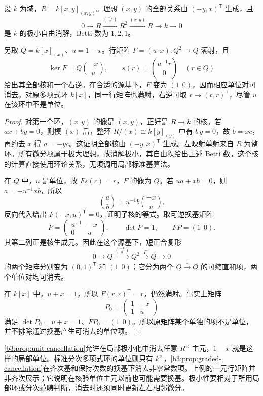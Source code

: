 \begin{example}\label{b3:exm:F-local-resolution}\label{b3:exm:F-module-unit}
	设 \(k\) 为域，\(R=k[x,y]_{(x,y)}\)。理想 \((x,y)\) 的全部关系由 \((-y,x)^{\mathsf T}\) 生成，且
	\[
		0\longrightarrow R \xrightarrow{\binom{-y}{x}}R^2 \xrightarrow{(x\ \ y)}R \longrightarrow k\longrightarrow0
	\]
	是 \(k\) 的极小自由消解，Betti 数为 \(1,2,1\)。

	另取 \(Q=k[x]_{(x)}\)、\(u=1-x\)。行矩阵 \(F=(u\ \ x):Q^2\rightarrow Q\) 满射，且
	\[
		\ker F=Q\binom{-x}{u}, \qquad s(r)=\binom{u^{-1}r}{0}\quad(r\in Q)
	\]
	给出其全部核和一个右逆。在合适的源基下，\(F\) 变为 \((1\ \ 0)\)，因而相应单位对可消去。对原多项式环 \(k[x]\)，同一行矩阵也满射，右逆可取 \(r\mapsto(r,r)^{\mathsf T}\)，尽管 \(u\) 在该环中不是单位。
\end{example}
\begin{proof}
	对第一个环，\((x\ \ y)\) 的像是 \((x,y)\)，正好是 \(R\rightarrow k\) 的核。若 \(ax+by=0\)，则模 \((x)\) 后，整环 \(R/(x)\cong k[y]_{(y)}\) 中有 \(\bar b\,y=0\)，故 \(b=xc\)，再约去 \(x\) 得 \(a=-yc\)。这证明全部核由 \((-y,x)^{\mathsf T}\) 生成。左映射单射来自 \(R\) 为整环。所有微分项属于极大理想，故消解极小，其自由秩给出上述 Betti 数。这个核的计算直接使用环论关系，无须调用局部标准基算法。

	在 \(Q\) 中，\(u\) 是单位，故 \(Fs(r)=r\)，\(F\) 的像为 \(Q\)。若 \(ua+xb=0\)，则 \(a=-u^{-1}xb\)，所以
	\[
		\binom{a}{b}=u^{-1}b\binom{-x}{u}.
	\]
	反向代入给出 \(F(-x,u)^{\mathsf T}=0\)，证明了核的等式。取可逆换基矩阵
	\[
		P=\begin{pmatrix}u^{-1}&-x\\0&u\end{pmatrix},
		\qquad \det P=1,\qquad FP=(1\ \ 0).
	\]
	其第二列正是核生成元。因此在这个源基下，短正合复形
	\[
		0\longrightarrow Q\xrightarrow{\binom{-x}{u}}Q^2 \xrightarrow{F}Q\longrightarrow0
	\]
	的两个矩阵分别变为 \((0,1)^{\mathsf T}\) 和 \((1\ \ 0)\)；它分为两个 \(Q\xrightarrow{1}Q\) 的可缩直和项，两个单位对均可消去。

	在 \(k[x]\) 中，\(u+x=1\)，所以 \(F(r,r)^{\mathsf T}=r\)，仍然满射。事实上矩阵
	\[
		P_0=\begin{pmatrix}1&-x\\1&u\end{pmatrix}
	\]
	满足 \(\det P_0=u+x=1\)、\(FP_0=(1\ \ 0)\)。所以原矩阵某个单独的项不是单位，并不排除通过换基产生可消去的单位项。
\end{proof}

\cref{b3:prop:unit-cancellation}允许在局部极小化中消去任意 \(R^\times\) 主元，\(1-x\) 就是这样的局部单位。标准分次多项式环的单位则只有 \(k^\times\)，\cref{b3:prop:graded-cancellation}在齐次基和保持次数的换基下消去非零常数项。上例的一元行矩阵并非齐次展示；它说明在核验单位主元以前也可能需要换基。极小性要相对于所用局部环或分次范畴判断，消去时还须同时更新左右相邻微分。


